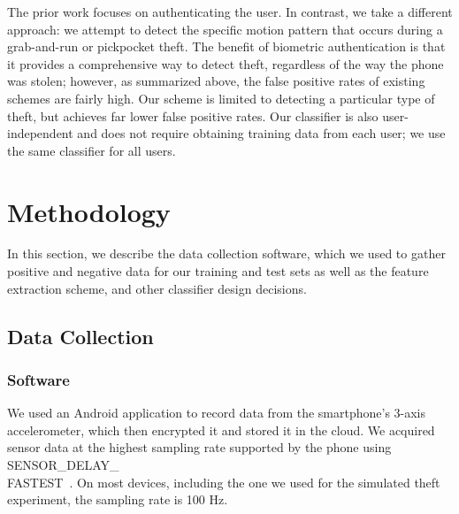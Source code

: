 The prior work focuses on authenticating the user.
In contrast, we take a different approach: we attempt to detect the
specific motion pattern that occurs during a grab-and-run or pickpocket theft.
The benefit of biometric authentication is that it provides a comprehensive
way to detect theft, regardless of the way the phone was stolen; however,
as summarized above, the false positive rates of existing schemes
are fairly high.
Our scheme is limited to detecting a particular type of theft, but achieves
far lower false positive rates.
Our classifier is also user-independent and does not require obtaining
training data from each user; we use the same classifier for all users.




\section{Methodology}

In this section, we describe the data collection software, which we used to gather positive and negative data for our training and test sets as well as the feature extraction scheme, and other classifier design decisions.

\subsection{Data Collection}

\subsubsection{Software}
We used an Android application to record data from the smartphone's 3-axis accelerometer, which then encrypted it and stored it in the cloud.
We acquired sensor data at the highest sampling rate supported by the phone using SENSOR\_DELAY\_\\FASTEST~\cite{android:doc}. 
On most devices, including the one we used for the simulated theft experiment, the sampling rate is 100 Hz. 

